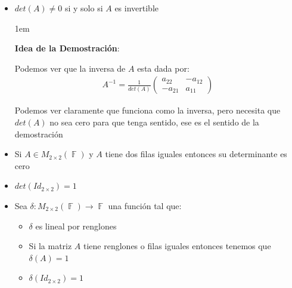 \documentclass[12pt, fleqn]{report}                             %
\newenvironment{SmallIndentation}[1][0.75em]                    %
        {\begin{adjustwidth}{#1}{}\begin{footnotesize}}             %
        {\end{footnotesize}\end{adjustwidth}}                       %
\theoremstyle{break}                                            %
\DeclareMathOperator \GenericField {\mathbb{F}}                 %
\newcommand{\pVector}[1]                                        %
        { \ensuremath{\begin{pmatrix}#1\end{pmatrix}} }             %
\begin{document}
\begin{itemize}
                    \begin{SmallIndentation}[1em]
                        \textbf{Demostración}:
                        
                        Es pura talacha men :v
                        
                    
                    \end{SmallIndentation}

                \item
                    $det(A) \neq 0$ si y solo si $A$ es invertible

                    \begin{SmallIndentation}[1em]
                        \textbf{Idea de la Demostración}:
                        
                        Podemos ver que la inversa de $A$ esta dada
                        por:
                        \begin{align*}
                            A^{-1}
                                = \frac{1}{det(A)} \pVector{
                                                         a_{22} & -a_{12} \\
                                                        -a_{21} &  a_{11}
                                                    }
                        \end{align*}

                        Podemos ver claramente que funciona como la inversa, pero
                        necesita que $det(A)$ no sea cero para que tenga sentido, ese
                        es el sentido de la demostración
                    
                    \end{SmallIndentation}


                \item
                    Si $A \in M_{2 \times 2}(\GenericField)$ y $A$ tiene dos filas iguales
                    entonces su determinante es cero

                \item
                    $det(Id_{2 \times 2}) = 1$

                \clearpage

                \item
                    Sea $\delta: M_{2 \times 2}(\GenericField) \to \GenericField$ una función
                    tal que:
                    \begin{itemize}
                        \item $\delta$ es lineal por renglones
                        \item Si la matriz $A$ tiene renglones o filas iguales entonces tenemos que
                            $\delta(A) = 1$
                        \item $\delta(Id_{2 \times 2}) = 1$
                    \end{itemize}


\end{itemize}
\end{document}
